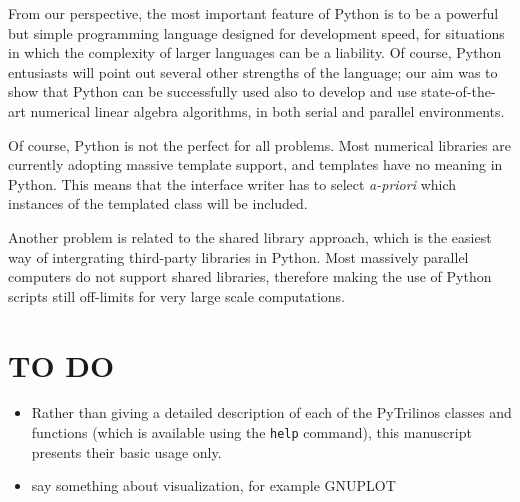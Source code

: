 \documentclass[10pt,relax]{SANDreport}
\begin{document}
From our perspective, the most important feature of Python is to be a powerful
but simple programming language designed for development speed, for
situations in which the complexity of larger languages can be a liability. Of
course, Python entusiasts will point out several other strengths of the
language; our aim was to show that Python can be successfully
used also to develop and use state-of-the-art numerical linear algebra
algorithms, in both serial and parallel environments.

Of course, Python is not the perfect for all problems. Most numerical
libraries are currently adopting massive template support, and templates have
no meaning in Python. This means that the interface writer has to select {\sl
  a-priori} which instances of the templated class will be included.

Another problem is related to the shared library approach, which is the
easiest way of intergrating third-party libraries in Python. Most massively
parallel computers do not support shared libraries, therefore making the use
of Python scripts still off-limits for very large scale computations.

\section{TO DO}

\begin{itemize}
\item Rather than giving a detailed description of each of the PyTrilinos classes
and functions (which is available using the {\tt help} command), this
manuscript presents their basic usage only.
\item say something about visualization, for example GNUPLOT
\end{itemize}



\end{document}
